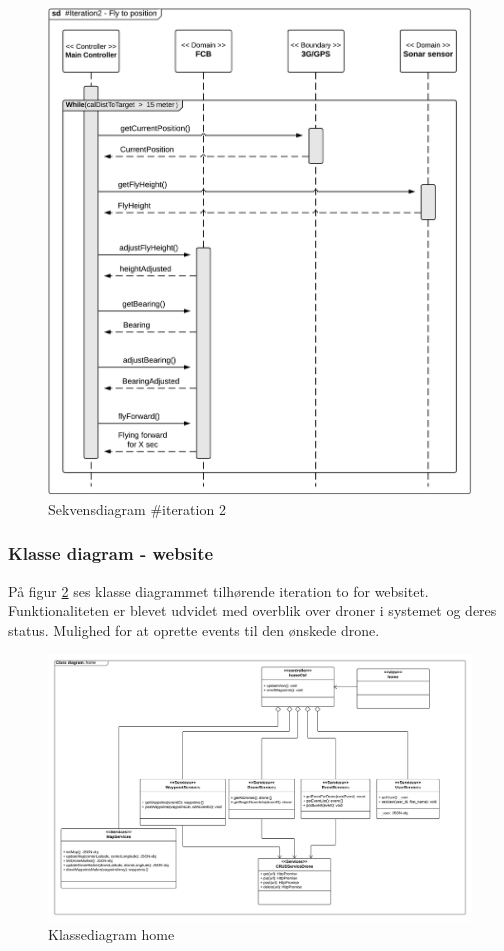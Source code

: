 \begin{figure}[H]
	\centering
	\includegraphics[width=1\textwidth]{Billeder/sekvens/sekvens_iteration2_3}
	\caption{Sekvensdiagram \#iteration 2}
	\label{fig:Sekvens_diagram_iteration2_3}
\end{figure}

\newpage
\subsubsection*{Klasse diagram - website}
\vspace{-0.1cm}
På figur \ref{fig:classDiagram_home} ses klasse diagrammet tilhørende iteration to for websitet. Funktionaliteten er blevet udvidet med overblik over droner i systemet og deres status. Mulighed for at oprette events til den ønskede drone. 
\begin{figure}[H]
	\centering
	\includegraphics[width=1.1\textwidth]{Billeder/klasse_diagrammer/home_class_diagram.png}
	\vspace{-0.5cm}
	\caption{Klassediagram home}
	\label{fig:classDiagram_home}
\end{figure}
